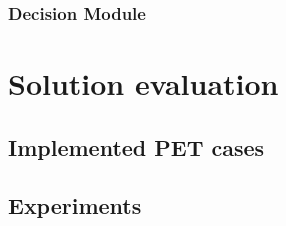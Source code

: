 \documentclass[10pt,a4paper]{article}
\begin{document}
\subsubsection{Decision Module} \label{dm}

\section{Solution evaluation} 
\subsection{Implemented PET cases} 
\subsection{Experiments} 

\pagebreak
\end{document}
